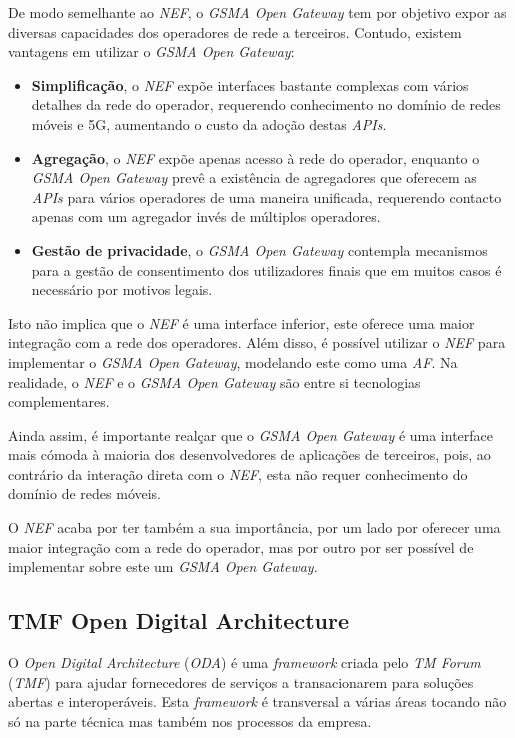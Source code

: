 De modo semelhante ao \emph{NEF}, o \emph{GSMA Open Gateway} tem por objetivo
expor as diversas capacidades dos operadores de rede a terceiros.
Contudo, existem vantagens em utilizar o \emph{GSMA Open Gateway}:

\begin{itemize}
	\item \textbf{Simplificação}, o \emph{NEF} expõe interfaces bastante
	      complexas com vários detalhes da rede do operador, requerendo
	      conhecimento no domínio de redes móveis e 5G, aumentando o custo da
	      adoção destas \emph{APIs}.
	\item \textbf{Agregação}, o \emph{NEF} expõe apenas acesso à rede do
	      operador, enquanto o \emph{GSMA Open Gateway} prevê a existência de
	      agregadores que oferecem as \emph{APIs} para vários operadores de uma
	      maneira unificada, requerendo contacto apenas com um agregador invés de
	      múltiplos operadores.
	\item \textbf{Gestão de privacidade}, o \emph{GSMA Open Gateway}
	      contempla mecanismos para a gestão de consentimento dos utilizadores
	      finais que em muitos casos é necessário por motivos legais.
\end{itemize}

Isto não implica que o \emph{NEF} é uma interface inferior, este oferece uma
maior integração com a rede dos operadores. Além disso, é possível utilizar o
\emph{NEF} para implementar o \emph{GSMA Open Gateway}, modelando este como uma
\emph{AF}. Na realidade, o \emph{NEF} e o \emph{GSMA Open Gateway} são entre si
tecnologias complementares.

Ainda assim, é importante realçar que o \emph{GSMA Open Gateway} é uma
interface mais cómoda à maioria dos desenvolvedores de aplicações de terceiros,
pois, ao contrário da interação direta com o \emph{NEF}, esta não requer
conhecimento do domínio de redes móveis.

O \emph{NEF} acaba por ter também a sua importância, por um lado por oferecer
uma maior integração com a rede do operador, mas por outro por ser possível de
implementar sobre este um \emph{GSMA Open Gateway}.

\subsection{TMF Open Digital Architecture}

O \emph{Open Digital Architecture} (\emph{ODA}) é uma \emph{framework} criada
pelo \emph{TM Forum} (\emph{TMF}) para ajudar fornecedores de serviços a
transacionarem para soluções abertas e interoperáveis. Esta \emph{framework} é
transversal a várias áreas tocando não só na parte técnica mas também nos
processos da empresa.

